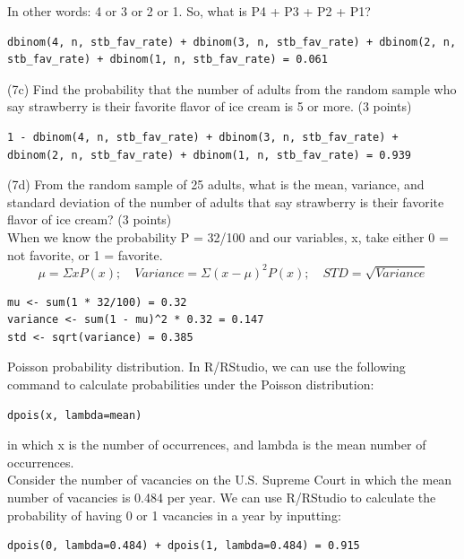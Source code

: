 \documentclass{article}
\begin{document}
In other words: 4 or 3 or 2 or 1. So, what is P4 + P3 + P2 + P1?
\begin{center}
\begin{lstlisting}
dbinom(4, n, stb_fav_rate) + dbinom(3, n, stb_fav_rate) + dbinom(2, n, stb_fav_rate) + dbinom(1, n, stb_fav_rate) = 0.061
\end{lstlisting}
\end{center}

(7c) Find the probability that the number of adults from the random sample who say strawberry is their favorite flavor of ice cream is 5 or more. (3 points)
\begin{center}
\begin{lstlisting}
1 - dbinom(4, n, stb_fav_rate) + dbinom(3, n, stb_fav_rate) + dbinom(2, n, stb_fav_rate) + dbinom(1, n, stb_fav_rate) = 0.939
\end{lstlisting}
\end{center}
(7d) From the random sample of 25 adults, what is the mean, variance, and standard deviation of the number of adults that say strawberry is their favorite flavor of ice cream? (3 points)\\

When we know the probability P = 32/100 and our variables, x, take either 0 = not favorite, or 1 = favorite. 
\[
\mu = \Sigma x P\left( x \right); \quad Variance = \Sigma \left( x - \mu \right)^{2} P \left( x \right); \quad STD = \sqrt{Variance}
\]

\begin{center}
\begin{lstlisting}
mu <- sum(1 * 32/100) = 0.32
variance <- sum(1 - mu)^2 * 0.32 = 0.147
std <- sqrt(variance) = 0.385
\end{lstlisting}
\end{center}


 

Poisson probability distribution. In R/RStudio, we can use the following command to calculate probabilities under the Poisson distribution:
\begin{center}
\begin{lstlisting}
dpois(x, lambda=mean)
\end{lstlisting}
\end{center}

in which x is the number of occurrences, and lambda is the mean number of occurrences.\\

Consider the number of vacancies on the U.S. Supreme Court in which the mean number of vacancies is 0.484 per year. We can use R/RStudio to calculate the probability of having 0 or 1 vacancies in a year by inputting:
\begin{center}
\begin{lstlisting}
dpois(0, lambda=0.484) + dpois(1, lambda=0.484) = 0.915
\end{lstlisting}
\end{center}
\end{document}
